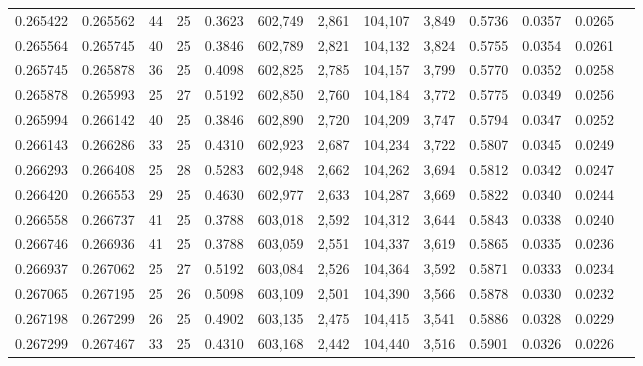 \begin{tabular}{rrrrrrrrrrrrr}
0.265422 & 0.265562 &    44 &  25 &                                     0.3623 & 602,749 &   2,861 & 104,107 &   3,849 & 0.5736 & 0.0357 & 0.0265 \\
0.265564 & 0.265745 &    40 &  25 &                                     0.3846 & 602,789 &   2,821 & 104,132 &   3,824 & 0.5755 & 0.0354 & 0.0261 \\
0.265745 & 0.265878 &    36 &  25 &                                     0.4098 & 602,825 &   2,785 & 104,157 &   3,799 & 0.5770 & 0.0352 & 0.0258 \\
0.265878 & 0.265993 &    25 &  27 &                                     0.5192 & 602,850 &   2,760 & 104,184 &   3,772 & 0.5775 & 0.0349 & 0.0256 \\
0.265994 & 0.266142 &    40 &  25 &                                     0.3846 & 602,890 &   2,720 & 104,209 &   3,747 & 0.5794 & 0.0347 & 0.0252 \\
0.266143 & 0.266286 &    33 &  25 &                                     0.4310 & 602,923 &   2,687 & 104,234 &   3,722 & 0.5807 & 0.0345 & 0.0249 \\
0.266293 & 0.266408 &    25 &  28 &                                     0.5283 & 602,948 &   2,662 & 104,262 &   3,694 & 0.5812 & 0.0342 & 0.0247 \\
0.266420 & 0.266553 &    29 &  25 &                                     0.4630 & 602,977 &   2,633 & 104,287 &   3,669 & 0.5822 & 0.0340 & 0.0244 \\
0.266558 & 0.266737 &    41 &  25 &                                     0.3788 & 603,018 &   2,592 & 104,312 &   3,644 & 0.5843 & 0.0338 & 0.0240 \\
0.266746 & 0.266936 &    41 &  25 &                                     0.3788 & 603,059 &   2,551 & 104,337 &   3,619 & 0.5865 & 0.0335 & 0.0236 \\
0.266937 & 0.267062 &    25 &  27 &                                     0.5192 & 603,084 &   2,526 & 104,364 &   3,592 & 0.5871 & 0.0333 & 0.0234 \\
0.267065 & 0.267195 &    25 &  26 &                                     0.5098 & 603,109 &   2,501 & 104,390 &   3,566 & 0.5878 & 0.0330 & 0.0232 \\
0.267198 & 0.267299 &    26 &  25 &                                     0.4902 & 603,135 &   2,475 & 104,415 &   3,541 & 0.5886 & 0.0328 & 0.0229 \\
0.267299 & 0.267467 &    33 &  25 &                                     0.4310 & 603,168 &   2,442 & 104,440 &   3,516 & 0.5901 & 0.0326 & 0.0226 \\

\end{tabular}
